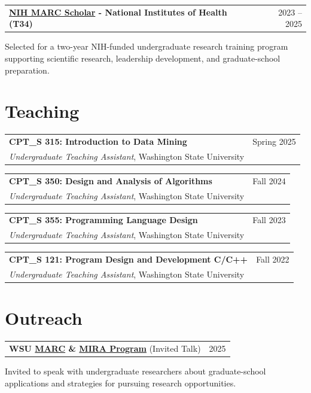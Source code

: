 \documentclass[margin,line]{res}
\begin{document}
\begin{resume}
\begin{tabularx}{\textwidth}{@{}X r@{}}
\textbf{\href{https://marc.wsu.edu/}{\textcolor{cvblue}{NIH MARC Scholar}} - National Institutes of Health (T34)} & {2023 -- 2025} \\
\end{tabularx}
Selected for a two-year NIH-funded undergraduate research training program supporting scientific research, leadership development, and graduate-school preparation.


\section{\sc Teaching}
\begin{tabularx}{\textwidth}{@{}X r@{}}
\textbf{CPT\_S 315: Introduction to Data Mining} & {Spring 2025} \\
\emph{Undergraduate Teaching Assistant}, Washington State University &  \\
\end{tabularx}

\begin{tabularx}{\textwidth}{@{}X r@{}}
\textbf{CPT\_S 350: Design and Analysis of Algorithms} & {Fall 2024} \\
\emph{Undergraduate Teaching Assistant}, Washington State University &  \\
\end{tabularx}

\begin{tabularx}{\textwidth}{@{}X r@{}}
\textbf{CPT\_S 355: Programming Language Design} & {Fall 2023} \\
\emph{Undergraduate Teaching Assistant}, Washington State University &  \\
\end{tabularx}

\begin{tabularx}{\textwidth}{@{}X r@{}}
\textbf{CPT\_S 121: Program Design and Development C/C++} & {Fall 2022} \\
\emph{Undergraduate Teaching Assistant}, Washington State University &  \\
\end{tabularx}


\section{\sc Outreach} 
\begin{tabularx}{\textwidth}{@{}X r@{}}
\textbf{WSU \href{https://marc.wsu.edu/}{\textcolor{cvblue}{MARC}} \& \href{https://mira.wsu.edu/}{\textcolor{cvblue}{MIRA Program}}} (Invited Talk) & {2025} \\
\end{tabularx}
Invited to speak with undergraduate researchers about graduate-school applications and strategies for pursuing research opportunities.


\end{resume}
\end{document}
